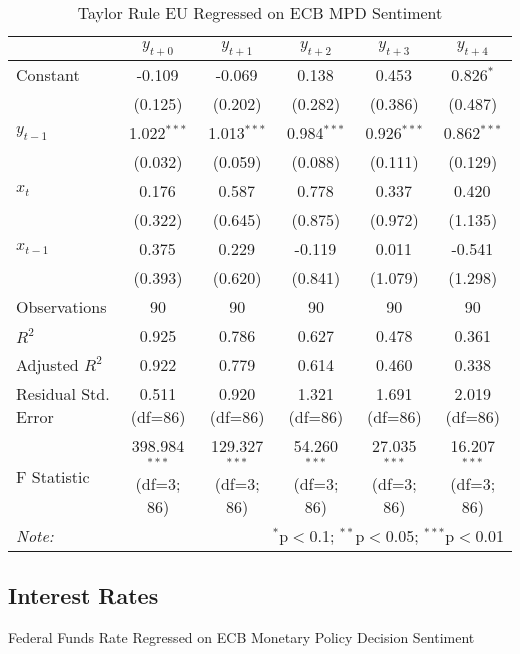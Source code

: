 \documentclass[12pt, letterpaper]{article}
\begin{document}
\begin{table}[H] \centering
  \caption{Taylor Rule EU Regressed on ECB MPD Sentiment}
  \begin{adjustbox}{width=\textwidth}
\begin{tabular}{lccccc}
\hline
\hline
 & $y_{t+0}$ & $y_{t+1}$ & $y_{t+2}$ & $y_{t+3}$ & $y_{t+4}$  \\
\hline
 Constant & -0.109$^{}$ & -0.069$^{}$ & 0.138$^{}$ & 0.453$^{}$ & 0.826$^{*}$ \\
& (0.125) & (0.202) & (0.282) & (0.386) & (0.487) \\
 $y_{t-1}$ & 1.022$^{***}$ & 1.013$^{***}$ & 0.984$^{***}$ & 0.926$^{***}$ & 0.862$^{***}$ \\
& (0.032) & (0.059) & (0.088) & (0.111) & (0.129) \\
 $x_{t}$ & 0.176$^{}$ & 0.587$^{}$ & 0.778$^{}$ & 0.337$^{}$ & 0.420$^{}$ \\
& (0.322) & (0.645) & (0.875) & (0.972) & (1.135) \\
 $x_{t-1}$ & 0.375$^{}$ & 0.229$^{}$ & -0.119$^{}$ & 0.011$^{}$ & -0.541$^{}$ \\
& (0.393) & (0.620) & (0.841) & (1.079) & (1.298) \\
\hline
 Observations & 90 & 90 & 90 & 90 & 90 \\
 $R^2$ & 0.925 & 0.786 & 0.627 & 0.478 & 0.361 \\
 Adjusted $R^2$ & 0.922 & 0.779 & 0.614 & 0.460 & 0.338 \\
 Residual Std. Error & 0.511 (df=86) & 0.920 (df=86) & 1.321 (df=86) & 1.691 (df=86) & 2.019 (df=86) \\
 F Statistic & 398.984$^{***}$ (df=3; 86) & 129.327$^{***}$ (df=3; 86) & 54.260$^{***}$ (df=3; 86) & 27.035$^{***}$ (df=3; 86) & 16.207$^{***}$ (df=3; 86) \\
\hline
\hline
\textit{Note:} & \multicolumn{5}{r}{$^{*}$p$<$0.1; $^{**}$p$<$0.05; $^{***}$p$<$0.01} \\
\end{tabular}
\end{adjustbox}
\end{table}

\subsection{Interest Rates}

Federal Funds Rate Regressed on ECB Monetary Policy Decision Sentiment
\end{document}
